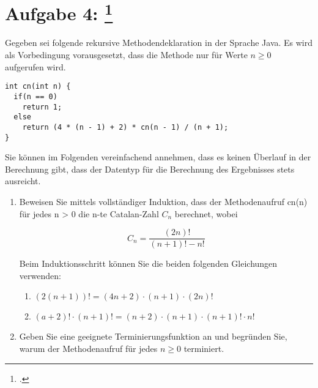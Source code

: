 \documentclass{lehramt-informatik-aufgabe}
\begin{document}
\section{Aufgabe 4:
\footcite{46116:2016:09}}

Gegeben sei folgende rekursive Methodendeklaration in der Sprache Java.
Es wird als Vorbedingung vorausgesetzt, dass die Methode 
nur für Werte $n \geq 0$ aufgerufen wird.

\begin{verbatim}
int cn(int n) {
  if(n == 0)
    return 1;
  else
    return (4 * (n - 1) + 2) * cn(n - 1) / (n + 1);
}
\end{verbatim}

\noindent
Sie können im Folgenden vereinfachend annehmen, dass es keinen Überlauf
in der Berechnung gibt, \dh dass der Datentyp  für die
Berechnung des Ergebnisses stets ausreicht.

\begin{enumerate}


\item Beweisen Sie mittels vollständiger Induktion, dass der
Methodenaufruf cn(n) für jedes n > 0 die n-te Catalan-Zahl $C_n$
berechnet, wobei

\begin{displaymath}
C_n =
\frac{(2n)!}
{(n + 1)!-n!}
\end{displaymath}

Beim Induktionsschritt können Sie die beiden folgenden Gleichungen
verwenden:

\begin{enumerate}

\item $(2(n + 1))! = (4n + 2) \cdot (n + 1) \cdot (2n)!$

\item $(a + 2)! \cdot (n+1)! = (n + 2) \cdot (n + 1) \cdot (n + 1)! \cdot n!$
\end{enumerate}


\item Geben Sie eine geeignete Terminierungsfunktion an und begründen
Sie, warum der Methodenaufruf  für jedes $n \geq 0$
terminiert.

\end{enumerate}
\end{document}
